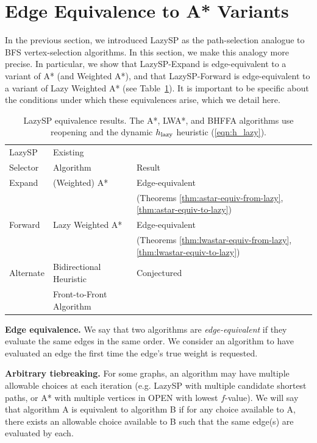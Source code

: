 \section{Edge Equivalence to A* Variants}

In the previous section,
we introduced LazySP as the path-selection analogue
to BFS vertex-selection algorithms.
In this section,
we make this analogy more precise.
In particular,
we show that LazySP-Expand
is edge-equivalent to a variant of A*
(and Weighted A*),
and that LazySP-Forward is edge-equivalent to a variant of
Lazy Weighted A*
(see Table~\ref{table:equivalences}).
It is important to be specific about the conditions under which
these equivalences arise,
which we detail here.

\begin{table}
   \centering
   {\small%
   \begin{tabular}{lll}
      \toprule
      LazySP & Existing & \\
      Selector & Algorithm & Result \\
      \midrule
      Expand & (Weighted) A* & Edge-equivalent \\
      & & (Theorems \ref{thm:astar-equiv-from-lazy},
                 \ref{thm:astar-equiv-to-lazy}) \\
      \addlinespace[0.3em]
      Forward & Lazy Weighted A* & Edge-equivalent \\
      & & (Theorems \ref{thm:lwastar-equiv-from-lazy},
                 \ref{thm:lwastar-equiv-to-lazy}) \\
      \addlinespace[0.3em]
      Alternate & Bidirectional Heuristic & Conjectured \\
      & Front-to-Front Algorithm & \\
      \bottomrule
   \end{tabular}%
   }%
   \caption{LazySP equivalence results.
      The A*, LWA*, and BHFFA algorithms use reopening and the dynamic
      $h_{\mbox{\scriptsize lazy}}$ heuristic (\ref{eqn:h_lazy}).}
   \label{table:equivalences}
\end{table}

\textbf{Edge equivalence.}
We say that two algorithms are \emph{edge-equivalent} if they
evaluate the same edges in the same order.
We consider an algorithm to have evaluated an edge
the first time the edge's true weight is requested.

\textbf{Arbitrary tiebreaking.}
For some graphs,
an algorithm may have multiple allowable choices at each iteration
(e.g. LazySP with multiple candidate shortest paths,
or A* with multiple vertices in OPEN with lowest $f$-value).
We will say that algorithm A is equivalent to algorithm B
if for any choice available to A,
there exists an allowable choice available to B
such that the same edge(s) are evaluated by each.

